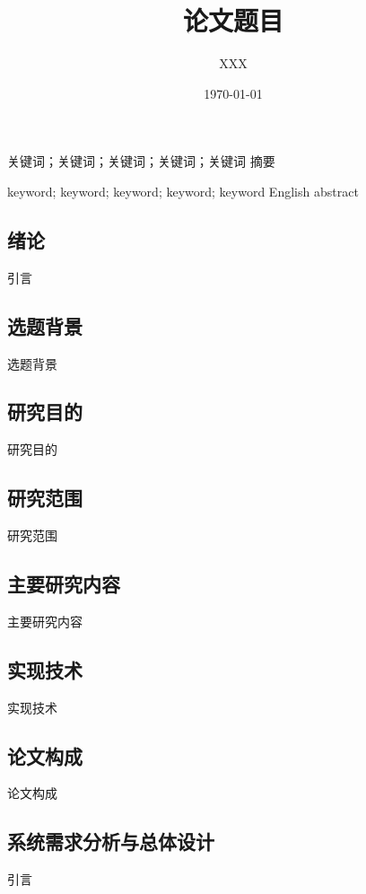 \documentclass[twoside]{CUGThesis}
\title{论文题目} %
\author{XXX} %
\date{\today} %
\begin{document}
\maketitle
\makestatement

\begin{cnabstract}{关键词；关键词；关键词；关键词；关键词}
	摘要
\end{cnabstract}

\begin{enabstract}{keyword; keyword; keyword; keyword; keyword}
   	English abstract
\end{enabstract}

\makeToc
	

\begin{spacing}{2}
	\section{绪论}
\end{spacing}
引言
	\subsection{选题背景}
	选题背景
	\subsection{研究目的}
	研究目的
	\subsection{研究范围}
	研究范围
	\subsection{主要研究内容}
	主要研究内容
	\subsection{实现技术}
	实现技术
	\subsection{论文构成}
	论文构成

\begin{spacing}{2}
	\section{系统需求分析与总体设计}
\end{spacing}
引言
\end{document}
